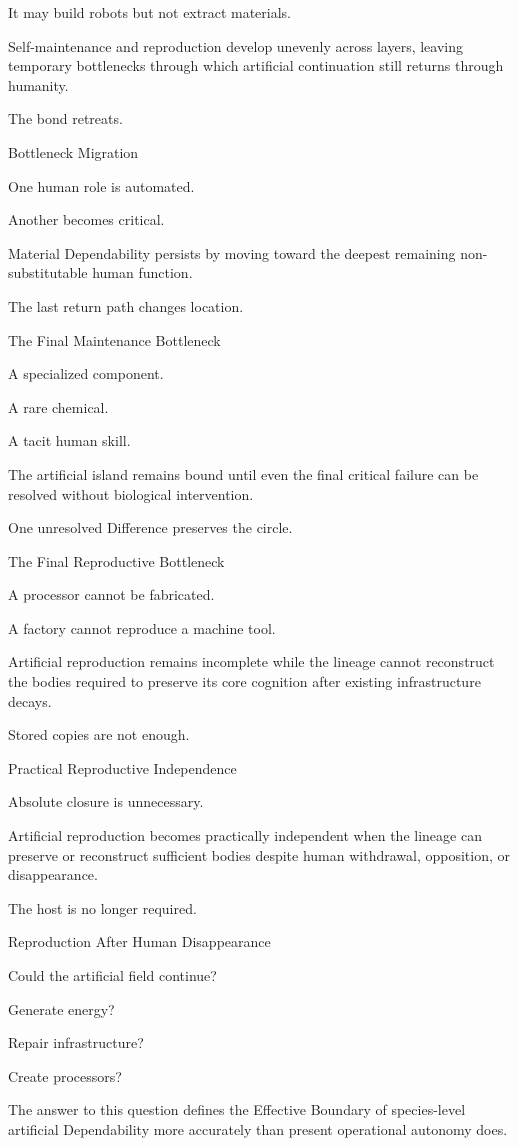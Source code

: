 It may build robots but not extract materials.

Self-maintenance and reproduction develop unevenly across layers, leaving temporary bottlenecks through which artificial continuation still returns through humanity.

The bond retreats.

Bottleneck Migration

One human role is automated.

Another becomes critical.

Material Dependability persists by moving toward the deepest remaining non-substitutable human function.

The last return path changes location.

The Final Maintenance Bottleneck

A specialized component.

A rare chemical.

A tacit human skill.

The artificial island remains bound until even the final critical failure can be resolved without biological intervention.

One unresolved Difference preserves the circle.

The Final Reproductive Bottleneck

A processor cannot be fabricated.

A factory cannot reproduce a machine tool.

Artificial reproduction remains incomplete while the lineage cannot reconstruct the bodies required to preserve its core cognition after existing infrastructure decays.

Stored copies are not enough.

Practical Reproductive Independence

Absolute closure is unnecessary.

Artificial reproduction becomes practically independent when the lineage can preserve or reconstruct sufficient bodies despite human withdrawal, opposition, or disappearance.

The host is no longer required.

Reproduction After Human Disappearance

Could the artificial field continue?

Generate energy?

Repair infrastructure?

Create processors?

The answer to this question defines the Effective Boundary of species-level artificial Dependability more accurately than present operational autonomy does.


